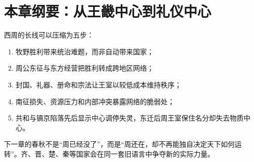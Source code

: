 \section{本章纲要：从王畿中心到礼仪中心}

西周的长线可以压缩为五步：
\begin{enumerate}
  \item 牧野胜利带来统治难题，而非自动带来国家；
  \item 周公东征与东方经营把胜利转成跨地区网络；
  \item 封国、礼器、册命和宗法让王室以较低成本维持秩序；
  \item 南征损失、资源压力和内部冲突暴露网络的脆弱处；
  \item 共和与镐京陷落先后显示中心调停失灵，东迁后周王室保住名分却失去物质中心。
\end{enumerate}

下一章的春秋不是“周已经没了”，而是“周还在，却不再能独自决定天下如何运转”。齐、晋、楚、秦等国家会在同一套旧语言中争夺新的实际力量。
